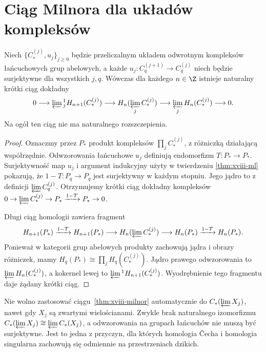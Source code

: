 \section{Ciąg Milnora dla układów kompleksów}
\begin{twierdzenie}
\label{thm:xviii-milnor}
Niech $\{C^{(j)}_*,u_j\}_{j\ge0}$ będzie przeliczalnym
układem odwrotnym kompleksów łańcuchowych grup abelowych,
a każde $u_j:C^{(j+1)}_q\to C^{(j)}_q$ niech będzie
surjektywne dla wszystkich $j,q$. Wówczas dla każdego $n\in\Z$
istnieje naturalny krótki ciąg dokładny
\[
0\longrightarrow\varprojlim{}^1_jH_{n+1}(C^{(j)}_*)
\longrightarrow H_n(\varprojlim_j C^{(j)}_*)
\longrightarrow\varprojlim_jH_n(C^{(j)}_*)
\longrightarrow0.
\]
Na ogół ten ciąg nie ma naturalnego rozszczepienia.
\end{twierdzenie}
\begin{proof}
Oznaczmy przez $P_*$ produkt kompleksów $\prod_j C^{(j)}_*$,
z różniczką działającą współrzędnie. Odwzorowania łańcuchowe $u_j$
definiują endomorfizm $T:P_*\to P_*$. Surjektywność map
$u_j$ i argument indukcyjny użyty w twierdzeniu
\ref{thm:xviii-ml} pokazują, że $1-T:P_q\to P_q$
jest surjektywny w każdym stopniu. Jego jądro to z definicji
$\varprojlim C^{(j)}_q$. Otrzymujemy krótki ciąg dokładny
kompleksów $0\to\varprojlim C^{(j)}_*\to P_*
\xrightarrow{1-T}P_*\to0$.

Długi ciąg homologii zawiera fragment
\[
H_{n+1}(P_*)\xrightarrow{1-T}H_{n+1}(P_*)
\longrightarrow H_n(\varprojlim C^{(j)}_*)
\longrightarrow H_n(P_*)\xrightarrow{1-T}H_n(P_*).
\]
Ponieważ w kategorii grup abelowych produkty zachowują
jądra i obrazy różniczek, mamy
$H_q(P_*)\cong\prod_jH_q(C^{(j)}_*)$.
Jądro prawego odwzorowania to $\varprojlim H_n(C^{(j)}_*)$,
a kokernel lewej to $\varprojlim{}^1 H_{n+1}(C^{(j)}_*)$.
Wyodrębnienie tego fragmentu daje żądany krótki ciąg.
\end{proof}
\begin{uwaga}
Nie wolno zastosować ciągu~\ref{thm:xviii-milnor}
automatycznie do $C_*(\varprojlim X_j)$, nawet gdy
$X_j$ są zwartymi wielościanami. Zwykle brak naturalnego
izomorfizmu $C_*(\varprojlim X_j)\cong\varprojlim C_*(X_j)$,
a odwzorowania na grupach łańcuchów nie muszą być surjektywne.
Jest to jedna z przyczyn, dla których homologia Čecha i homologia
singularna zachowują się odmiennie na przestrzeniach dzikich.
\end{uwaga}

